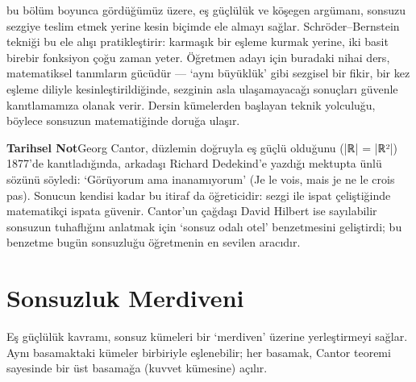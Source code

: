 bu bölüm boyunca gördüğümüz üzere, eş güçlülük ve köşegen argümanı, sonsuzu sezgiye teslim etmek yerine kesin biçimde ele almayı sağlar. Schröder–Bernstein tekniği bu ele alışı pratikleştirir: karmaşık bir eşleme kurmak yerine, iki basit birebir fonksiyon çoğu zaman yeter. Öğretmen adayı için buradaki nihai ders, matematiksel tanımların gücüdür — ‘aynı büyüklük’ gibi sezgisel bir fikir, bir kez eşleme diliyle kesinleştirildiğinde, sezginin asla ulaşamayacağı sonuçları güvenle kanıtlamamıza olanak verir. Dersin kümelerden başlayan teknik yolculuğu, böylece sonsuzun matematiğinde doruğa ulaşır.

\begin{tcolorbox}[bookbox,colback=cDef]\textbf{\textsf{\textcolor{cAcc}{Tarihsel Not}}}\quad Georg Cantor, düzlemin doğruyla eş güçlü olduğunu (|ℝ| = |ℝ²|) 1877’de kanıtladığında, arkadaşı Richard Dedekind’e yazdığı mektupta ünlü sözünü söyledi: ‘Görüyorum ama inanamıyorum’ (Je le vois, mais je ne le crois pas). Sonucun kendisi kadar bu itiraf da öğreticidir: sezgi ile ispat çeliştiğinde matematikçi ispata güvenir. Cantor’un çağdaşı David Hilbert ise sayılabilir sonsuzun tuhaflığını anlatmak için ‘sonsuz odalı otel’ benzetmesini geliştirdi; bu benzetme bugün sonsuzluğu öğretmenin en sevilen aracıdır.\end{tcolorbox}

\section{Sonsuzluk Merdiveni}

Eş güçlülük kavramı, sonsuz kümeleri bir ‘merdiven’ üzerine yerleştirmeyi sağlar. Aynı basamaktaki kümeler birbiriyle eşlenebilir; her basamak, Cantor teoremi sayesinde bir üst basamağa (kuvvet kümesine) açılır.

